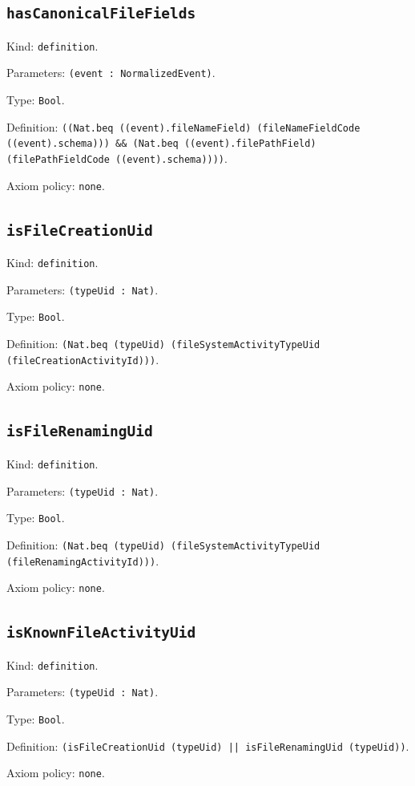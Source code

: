 \documentclass[11pt]{article}
\begin{document}
\subsection*{\texttt{hasCanonicalFileFields}}
\noindent Kind: \texttt{definition}.\par
\noindent Parameters: \texttt{(event : NormalizedEvent)}.\par
\noindent Type: \texttt{Bool}.\par
\noindent Definition: \texttt{((Nat.beq ((event).fileNameField) (fileNameFieldCode ((event).schema))) \&\& (Nat.beq ((event).filePathField) (filePathFieldCode ((event).schema))))}.\par
\noindent Axiom policy: \texttt{none}.\par
\subsection*{\texttt{isFileCreationUid}}
\noindent Kind: \texttt{definition}.\par
\noindent Parameters: \texttt{(typeUid : Nat)}.\par
\noindent Type: \texttt{Bool}.\par
\noindent Definition: \texttt{(Nat.beq (typeUid) (fileSystemActivityTypeUid (fileCreationActivityId)))}.\par
\noindent Axiom policy: \texttt{none}.\par
\subsection*{\texttt{isFileRenamingUid}}
\noindent Kind: \texttt{definition}.\par
\noindent Parameters: \texttt{(typeUid : Nat)}.\par
\noindent Type: \texttt{Bool}.\par
\noindent Definition: \texttt{(Nat.beq (typeUid) (fileSystemActivityTypeUid (fileRenamingActivityId)))}.\par
\noindent Axiom policy: \texttt{none}.\par
\subsection*{\texttt{isKnownFileActivityUid}}
\noindent Kind: \texttt{definition}.\par
\noindent Parameters: \texttt{(typeUid : Nat)}.\par
\noindent Type: \texttt{Bool}.\par
\noindent Definition: \texttt{(isFileCreationUid (typeUid) || isFileRenamingUid (typeUid))}.\par
\noindent Axiom policy: \texttt{none}.\par
\end{document}
